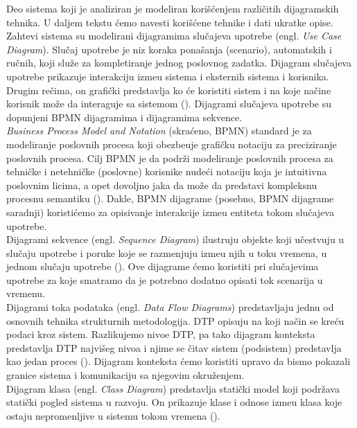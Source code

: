 Deo sistema koji je analiziran je modeliran kori\v s\' cenjem razli\v citih dijagramskih tehnika. U daljem tekstu \'cemo navesti kori\v s\'cene tehnike i dati ukratke opise.\\

Zahtevi sistema su modelirani dijagramima slu\v cajeva upotrebe (engl. \textit{Use Case Diagram}). Slu\v caj upotrebe je niz koraka pona\v sanja (scenario), automatskih i ru\v cnih, koji slu\v ze za kompletiranje jednog poslovnog zadatka. Dijagram slu\v cajeva upotrebe prikazuje interakciju izme\dj u sistema i eksternih sistema i korisnika. Drugim re\v cima, on grafi\v cki predstavlja ko \' ce koristiti sistem i na koje na\v cine korisnik mo\v ze da interaguje sa sistemom (\cite{SADM}). Dijagrami slu\v cajeva upotrebe su dopunjeni BPMN dijagramima i dijagramima sekvence.\\

\textit{Business Process Model and Notation} (skra\' ceno, BPMN) standard je za modeliranje poslovnih procesa koji obezbe\dj uje grafi\v cku notaciju za preciziranje poslovnih procesa. Cilj BPMN je da podr\v zi modeliranje poslovnih procesa za tehni\v cke i netehni\v cke (poslovne) korisnike nude\' ci notaciju koja je intuitivna poslovnim licima, a opet dovoljno jaka da mo\v ze da predstavi kompleksnu procesnu semantiku (\cite{BPMN}). Dakle, BPMN dijagrame (posebno, BPMN dijagrame saradnji) koristi\' cemo za opisivanje interakcije izme\dj u entiteta tokom slu\v cajeva upotrebe.\\

Dijagrami sekvence (engl. \textit{Sequence Diagram}) ilustruju objekte koji u\v cestvuju u slu\v caju upotrebe i poruke koje se razmenjuju izme\dj u njih u toku vremena, u jednom slu\v caju upotrebe (\cite{SAAD}). Ove dijagrame \' cemo koristiti pri slu\v cajevima upotrebe za koje smatramo da je potrebno dodatno opisati tok scenarija u vremenu.\\

Dijagrami toka podataka (engl. \textit{Data Flow Diagrams}) predstavljaju jednu od osnovnih tehnika strukturnih metodologija. DTP opisuju na koji na\v cin se kre\' cu podaci kroz sistem. Razlikujemo nivoe DTP, pa tako dijagram konteksta predstavlja DTP najvi\v seg nivoa i njime se \v citav sistem (podsistem) predstavlja kao jedan proces (\cite{smalkov-slajdovi}). Dijagram konteksta \' cemo koristiti upravo da bismo pokazali granice sistema i komunikaciju sa njegovim okru\v zenjem.\\

Dijagram klasa (engl. \textit{Class Diagram}) predstavlja stati\v cki model koji podr\v zava stati\v cki pogled sistema u razvoju. On prikazuje klase i odnose izme\dj u klasa koje ostaju nepromenljive u sistemu tokom vremena (\cite{SAAD}).\\

